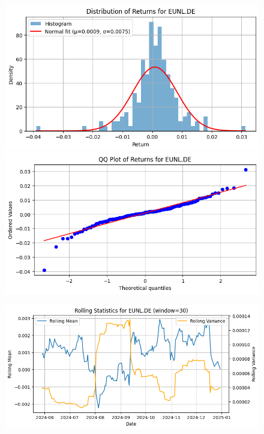 \documentclass{article}%
\begin{document}
\begin{figure}[htbp]%
\begin{minipage}{0.49\textwidth}%
\includegraphics[width=\linewidth]{ticker_images/EUNL.DE_return_distribution.png}%
\end{minipage}%
\begin{minipage}{0.49\textwidth}%
\includegraphics[width=\linewidth]{ticker_images/EUNL.DE_qq_plot.png}%
\end{minipage}%
\end{figure}

%


\begin{figure}[htbp]%
\begin{minipage}{0.49\textwidth}%
\includegraphics[width=\linewidth]{ticker_images/EUNL.DE_rolling_stats.png}%
\end{minipage}%
\end{figure}
\end{document}
